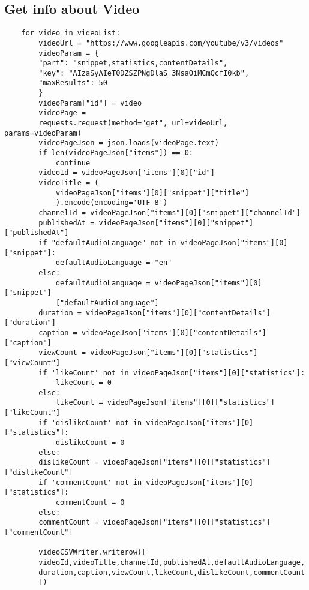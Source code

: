 \documentclass[10pt]{article}
\begin{document}
	\subsection{Get info about Video}
	\begin{lstlisting}
	for video in videoList:
		videoUrl = "https://www.googleapis.com/youtube/v3/videos"
		videoParam = {
		"part": "snippet,statistics,contentDetails",
		"key": "AIzaSyAIeT0DZSZPNgDlaS_3NsaOiMCmQcfI0kb",
		"maxResults": 50
		}
		videoParam["id"] = video
		videoPage = 
		requests.request(method="get", url=videoUrl, params=videoParam)
		videoPageJson = json.loads(videoPage.text)
		if len(videoPageJson["items"]) == 0:
			continue
		videoId = videoPageJson["items"][0]["id"]
		videoTitle = (
			videoPageJson["items"][0]["snippet"]["title"]
			).encode(encoding='UTF-8')
		channelId = videoPageJson["items"][0]["snippet"]["channelId"]
		publishedAt = videoPageJson["items"][0]["snippet"]["publishedAt"]
		if "defaultAudioLanguage" not in videoPageJson["items"][0]["snippet"]:
			defaultAudioLanguage = "en"
		else:
			defaultAudioLanguage = videoPageJson["items"][0]["snippet"]
			["defaultAudioLanguage"]
		duration = videoPageJson["items"][0]["contentDetails"]["duration"]
		caption = videoPageJson["items"][0]["contentDetails"]["caption"]
		viewCount = videoPageJson["items"][0]["statistics"]["viewCount"]
		if 'likeCount' not in videoPageJson["items"][0]["statistics"]:
			likeCount = 0
		else:
			likeCount = videoPageJson["items"][0]["statistics"]["likeCount"]
		if 'dislikeCount' not in videoPageJson["items"][0]["statistics"]:
			dislikeCount = 0
		else:
		dislikeCount = videoPageJson["items"][0]["statistics"]["dislikeCount"]
		if 'commentCount' not in videoPageJson["items"][0]["statistics"]:
			commentCount = 0
		else:
		commentCount = videoPageJson["items"][0]["statistics"]["commentCount"]
	
		videoCSVWriter.writerow([
		videoId,videoTitle,channelId,publishedAt,defaultAudioLanguage,
		duration,caption,viewCount,likeCount,dislikeCount,commentCount
		])
	\end{lstlisting}
\end{document}
